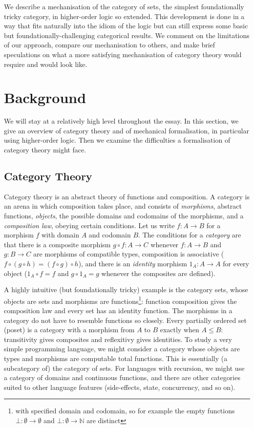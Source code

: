 \documentclass[twoside,titlepage,11pt]{article}
\begin{document}
We describe a mechanisation of the category of sets, the simplest foundationally tricky category, in higher-order logic so extended.
This development is done in a way that fits naturally into the idiom of the logic but can still express some basic but foundationally-challenging categorical results.
We comment on the limitations of our approach, compare our mechanisation to others, and make brief speculations on what a more satisfying mechanisation of category theory would require and would look like.
\section{Background}%
We will stay at a relatively high level throughout the essay.
In this section, we give an overview of category theory and of mechanical formalisation, in particular using higher-order logic.
Then we examine the difficulties a formalisation of category theory might face.
\subsection{Category Theory}%
Category theory is an abstract theory of functions and composition.
A category is an arena in which composition takes place, and consists of \emph{morphisms}, abstract functions, \emph{objects}, the possible domains and codomains of the morphisms, and a \emph{composition law}, obeying certain conditions.
Let us write $f:A\to B$ for a morphism $f$ with domain $A$ and codomain $B$.
The conditions for a \emph{category} are that there is a composite morphism $g\circ f:A\to C$ whenever $f:A\to B$ and $g:B\to C$ are morphisms of compatible types, composition is associative ($f\circ(g\circ h)=(f\circ g)\circ h$), and there is an \emph{identity} morphism ${1_A}:A\to A$ for every object (${1_A}\circ f=f$ and $g\circ{1_A}=g$ whenever the composites are defined).

A highly intuitive (but foundationally tricky) example is the category sets, whose objects are sets and morphisms are functions\footnote{with specified domain and codomain, so for example the empty functions $\bot:\emptyset\to\emptyset$ and $\bot:\emptyset\to\mathbb{N}$ are distinct}: function composition gives the composition law and every set has an identity function.
The morphisms in a category do not have to resemble functions so closely.
Every partially ordered set (poset) is a category with a morphism from $A$ to $B$ exactly when $A\leq B$: transitivity gives composites and reflexitivy gives identities.
To study a very simple programming language, we might consider a category whose objects are types and morphisms are computable total functions.
This is essentially (a subcategory of) the category of sets.
For languages with recursion, we might use a category of domains and continuous functions, and there are other categories suited to other language features (side-effects, state, concurrency, and so on).
\end{document}
